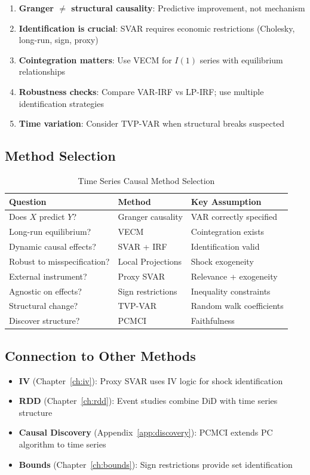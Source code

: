 \begin{enumerate}
    \item \textbf{Granger $\neq$ structural causality}: Predictive improvement, not mechanism
    \item \textbf{Identification is crucial}: SVAR requires economic restrictions (Cholesky, long-run, sign, proxy)
    \item \textbf{Cointegration matters}: Use VECM for $I(1)$ series with equilibrium relationships
    \item \textbf{Robustness checks}: Compare VAR-IRF vs LP-IRF; use multiple identification strategies
    \item \textbf{Time variation}: Consider TVP-VAR when structural breaks suspected
\end{enumerate}

\subsection{Method Selection}

\begin{table}[h]
\centering
\caption{Time Series Causal Method Selection}
\begin{tabular}{lll}
\toprule
Question & Method & Key Assumption \\
\midrule
Does $X$ predict $Y$? & Granger causality & VAR correctly specified \\
Long-run equilibrium? & VECM & Cointegration exists \\
Dynamic causal effects? & SVAR + IRF & Identification valid \\
Robust to misspecification? & Local Projections & Shock exogeneity \\
External instrument? & Proxy SVAR & Relevance + exogeneity \\
Agnostic on effects? & Sign restrictions & Inequality constraints \\
Structural change? & TVP-VAR & Random walk coefficients \\
Discover structure? & PCMCI & Faithfulness \\
\bottomrule
\end{tabular}
\end{table}

\subsection{Connection to Other Methods}

\begin{itemize}
    \item \textbf{IV} (Chapter~\ref{ch:iv}): Proxy SVAR uses IV logic for shock identification
    \item \textbf{RDD} (Chapter~\ref{ch:rdd}): Event studies combine DiD with time series structure
    \item \textbf{Causal Discovery} (Appendix~\ref{app:discovery}): PCMCI extends PC algorithm to time series
    \item \textbf{Bounds} (Chapter~\ref{ch:bounds}): Sign restrictions provide set identification
\end{itemize}

